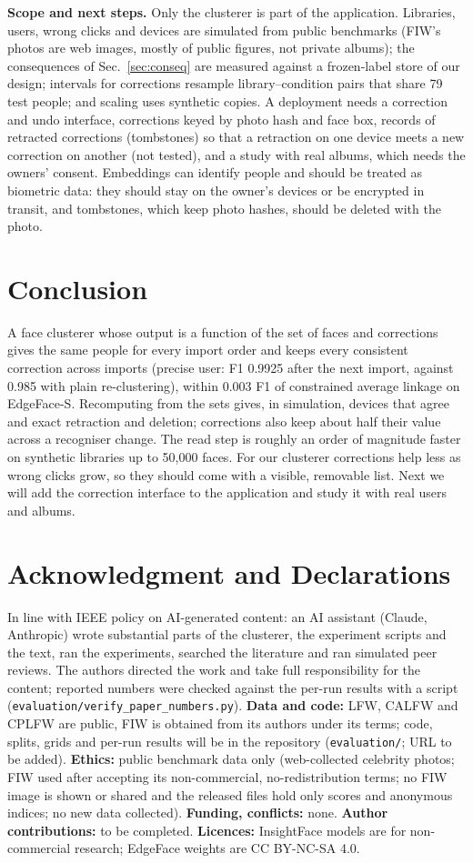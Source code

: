 \documentclass[conference]{IEEEtran}
\begin{document}
\textbf{Scope and next steps.} Only the clusterer is part of the application. Libraries, users, wrong clicks and devices are
simulated from public benchmarks (FIW's photos are web images, mostly of public figures, not private albums); the consequences
of Sec.~\ref{sec:conseq} are measured against a frozen-label store of our design; intervals for corrections resample
library--condition pairs that share 79 test people; and scaling uses synthetic copies. A deployment needs a correction and undo
interface, corrections keyed by photo hash and face box, records of retracted corrections (tombstones) so that a retraction on
one device meets a new correction on another (not tested), and a study with real albums, which needs the owners' consent.
Embeddings can identify people and should be treated as biometric data: they should stay on the owner's devices or be encrypted
in transit, and tombstones, which keep photo hashes, should be deleted with the photo.

\section{Conclusion}
A face clusterer whose output is a function of the set of faces and corrections gives the same people for every import order
and keeps every consistent correction across imports (precise user: F1 0.9925 after the next import, against 0.985 with plain
re-clustering), within 0.003 F1 of constrained average linkage on EdgeFace-S. Recomputing from the sets gives, in simulation,
devices that agree and exact retraction and deletion; corrections also keep about half their value across a recogniser
change. The read step is roughly an order of magnitude faster on synthetic libraries up to 50{,}000 faces. For our clusterer corrections help
less as wrong clicks grow, so they should come with a visible, removable list. Next we will add the correction interface to
the application and study it with real users and albums.

\section*{Acknowledgment and Declarations}
In line with IEEE policy on AI-generated content: an AI assistant (Claude, Anthropic) wrote substantial parts of the
clusterer, the experiment scripts and the text, ran the experiments, searched the literature and ran simulated peer reviews.
The authors directed the work and take full responsibility for the content; reported numbers were checked against the
per-run results with a script (\texttt{evaluation/verify\_paper\_numbers.py}).
\textbf{Data and code:} LFW, CALFW and CPLFW are public, FIW is obtained from its authors under its terms; code, splits, grids and per-run results will be in the repository
(\texttt{evaluation/}; URL to be added). \textbf{Ethics:} public benchmark data only (web-collected celebrity photos; FIW used after accepting its non-commercial, no-redistribution terms; no FIW image is shown or shared and the released files hold only scores and anonymous indices; no new data collected). \textbf{Funding, conflicts:} none.
\textbf{Author contributions:} to be completed. \textbf{Licences:} InsightFace models are for non-commercial research;
EdgeFace weights are CC BY-NC-SA 4.0.



\end{document}

